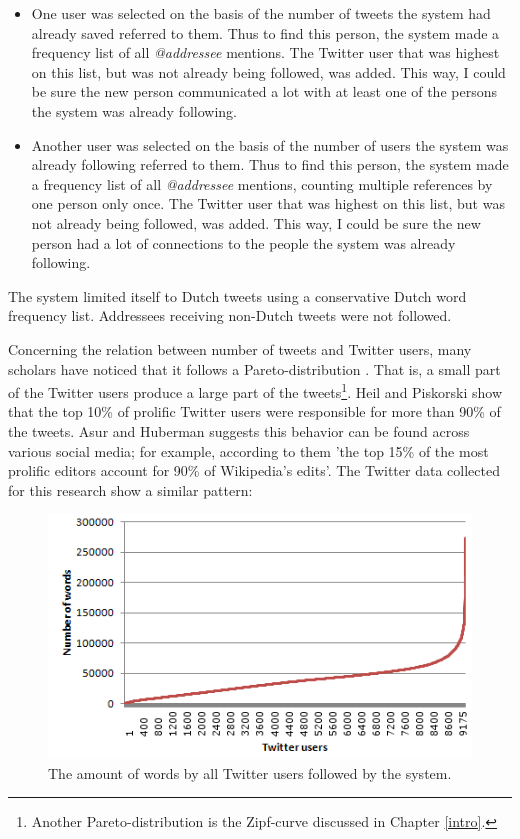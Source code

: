 \documentclass[11pt]{article}
\begin{document}
\begin{itemize}
\item One user was selected on the basis of the number of tweets the system had already saved referred to them. Thus to find this person, the system made a frequency list of all \emph{@addressee} mentions. The Twitter user that was highest on this list, but was not already being followed, was added. This way, I could be sure the new person communicated a lot with at least one of the persons the system was already following.
\item Another user was selected on the basis of the number of users the system was already following referred to them. Thus to find this person, the system made a frequency list of all \emph{@addressee} mentions, counting multiple references by one person only once. The Twitter user that was highest on this list, but was not already being followed, was added. This way, I could be sure the new person had a lot of connections to the people the system was already following.
\end{itemize}

The system limited itself to Dutch tweets using a conservative Dutch word frequency list. Addressees receiving non-Dutch tweets were not followed.

Concerning the relation between number of tweets and Twitter users, many scholars have noticed that it follows a Pareto-distribution \cite{asur+10,rui+12}. That is, a small part of the Twitter users produce a large part of the tweets\footnote{Another Pareto-distribution is the Zipf-curve discussed in Chapter \ref{intro}.}. Heil and Piskorski  show that the top 10\% of prolific Twitter users were responsible for more than 90\% of the tweets. Asur and Huberman  suggests this behavior can be found across various social media; for example, according to them 'the top 15\% of the most prolific editors account for 90\% of Wikipedia's edits'. The Twitter data collected for this research show a similar pattern:

\begin{figure}[H] \centering
\includegraphics[scale=1]{zipf_twitter}
\caption{The amount of words by all Twitter users followed by the system.}
\label{lcurve}
\end{figure} 
\end{document}
